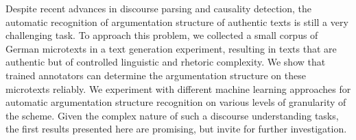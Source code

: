 Despite recent advances in discourse parsing and causality detection, the automatic recognition of argumentation structure of authentic texts is still a very challenging task. To approach this problem, we collected a small corpus of German microtexts in a text generation experiment, resulting in texts that are authentic but of controlled linguistic and rhetoric complexity. We show that trained annotators can determine the argumentation structure on these microtexts reliably. We experiment with different machine learning approaches for automatic argumentation structure recognition on various levels of granularity of the scheme. Given the complex nature of such a discourse understanding tasks, the first results presented here are promising, but invite for further investigation.
